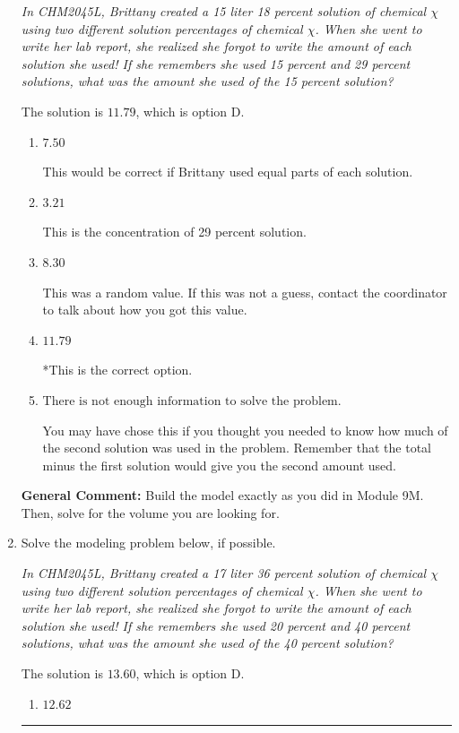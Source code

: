 \documentclass{extbook}[14pt]
\newcommand{\litem}[1]{\item #1

\rule{\textwidth}{0.4pt}}
\begin{document}
\begin{enumerate}
{\begin{center}
    \textit{ In CHM2045L, Brittany created a 15 liter 18 percent solution of chemical $\chi$ using two different solution percentages of chemical $\chi$. When she went to write her lab report, she realized she forgot to write the amount of each solution she used! If she remembers she used 15 percent and 29 percent solutions, what was the amount she used of the 15 percent solution? }
\end{center}
The solution is \( 11.79 \), which is option D.\begin{enumerate}[label=\Alph*.]
\item \( 7.50 \)

This would be correct if Brittany used equal parts of each solution.
\item \( 3.21 \)

This is the concentration of 29 percent solution.
\item \( 8.30 \)

This was a random value. If this was not a guess, contact the coordinator to talk about how you got this value.
\item \( 11.79 \)

*This is the correct option.
\item \( \text{There is not enough information to solve the problem.} \)

You may have chose this if you thought you needed to know how much of the second solution was used in the problem. Remember that the total minus the first solution would give you the second amount used.
\end{enumerate}

\textbf{General Comment:} Build the model exactly as you did in Module 9M. Then, solve for the volume you are looking for.
}
\litem{
Solve the modeling problem below, if possible.

\begin{center}
    \textit{ In CHM2045L, Brittany created a 17 liter 36 percent solution of chemical $\chi$ using two different solution percentages of chemical $\chi$. When she went to write her lab report, she realized she forgot to write the amount of each solution she used! If she remembers she used 20 percent and 40 percent solutions, what was the amount she used of the 40 percent solution? }
\end{center}
The solution is \( 13.60 \), which is option D.\begin{enumerate}[label=\Alph*.]
\item \( 12.62 \)


\end{enumerate}}
\end{enumerate}
\end{document}

